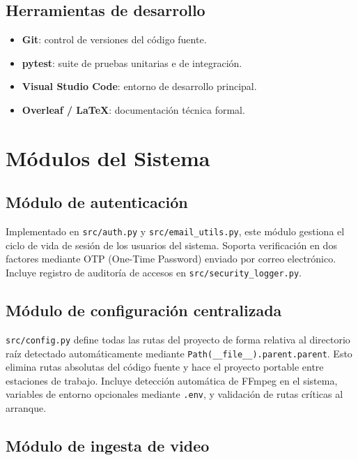 \documentclass[12pt]{report}
\begin{document}
\section{Herramientas de desarrollo}

\begin{itemize}[leftmargin=*]
    \item \textbf{Git}: control de versiones del código fuente.
    \item \textbf{pytest}: suite de pruebas unitarias e de integración.
    \item \textbf{Visual Studio Code}: entorno de desarrollo principal.
    \item \textbf{Overleaf / LaTeX}: documentación técnica formal.
\end{itemize}

\chapter{Módulos del Sistema}

\section{Módulo de autenticación}

Implementado en \texttt{src/auth.py} y \texttt{src/email\_utils.py}, este módulo
gestiona el ciclo de vida de sesión de los usuarios del sistema. Soporta
verificación en dos factores mediante OTP (One-Time Password) enviado por
correo electrónico. Incluye registro de auditoría de accesos en
\texttt{src/security\_logger.py}.

\section{Módulo de configuración centralizada}

\texttt{src/config.py} define todas las rutas del proyecto de forma relativa
al directorio raíz detectado automáticamente mediante \texttt{Path(\_\_file\_\_).parent.parent}.
Esto elimina rutas absolutas del código fuente y hace el proyecto portable entre
estaciones de trabajo. Incluye detección automática de FFmpeg en el sistema,
variables de entorno opcionales mediante \texttt{.env}, y validación de rutas
críticas al arranque.

\section{Módulo de ingesta de video}
\end{document}
